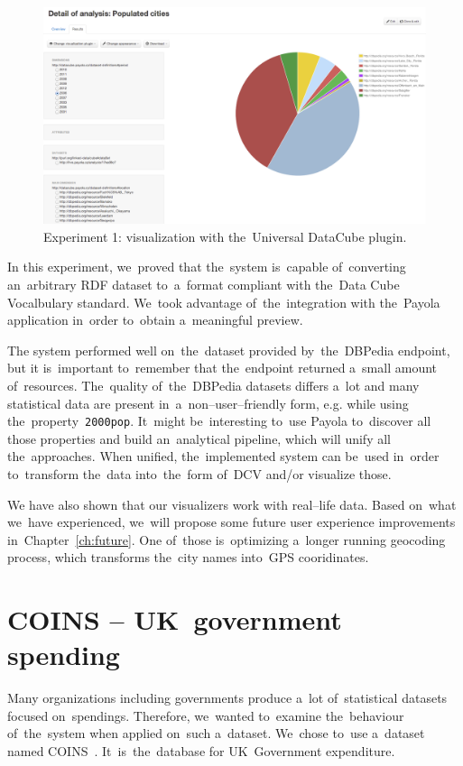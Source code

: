 \begin{figure}
  \centering
  \includegraphics[width=140mm]{img/payola-exp-01-vis2.png}
  \caption{Experiment 1: visualization with the~Universal DataCube plugin.}
  \label{fig:payola-exp-01-vis2}
\end{figure}

In this experiment, we~proved that the~system is~capable of~converting an~arbitrary RDF dataset to~a~format compliant with the~Data Cube Vocalbulary 
standard. We~took advantage of~the~integration with the~Payola application in~order to~obtain a~meaningful preview.

The system performed well on~the~dataset provided by~the~DBPedia endpoint, but 
it is~important to~remember that the~endpoint returned a~small amount of~resources. The~quality of~the~DBPedia datasets differs a~lot and many 
statistical data are present in~a~non--user--friendly form, e.g. while using the~property~\texttt{2000pop}. It~might be~interesting to~use Payola to~discover 
all those properties and build an~analytical pipeline, which will unify all the~approaches. When unified, the~implemented system can be~used in~order to~transform the~data into~the~form of~DCV and/or visualize those.

We have also shown that our visualizers work with real--life data. Based on~what we~have experienced, we~will propose some future user experience 
improvements in~Chapter~\ref{ch:future}. One of~those is~optimizing a~longer running 
geocoding process, which transforms the~city names into~GPS cooridinates.

\section{COINS -- UK~government spending}
Many organizations including governments produce a~lot of~statistical datasets 
focused on~spendings. Therefore, we~wanted to~examine the~behaviour of~the~system when applied on~such a~dataset. We~chose to~use a~dataset named 
COINS~\cite{coins}. It~is~the~database for UK~Government expenditure.

